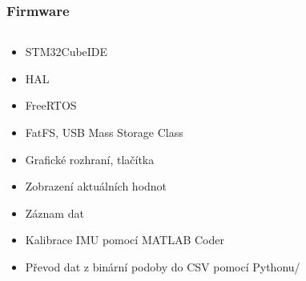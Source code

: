 \documentclass[%
  12pt,       				%
	t,                  %
	aspectratio=1610,   %
	unicode,						%
]{beamer}				    	%
\begin{document}
\begin{frame}
\begin{columns}[T]
\begin{column}{0.5\textwidth}
\begin{figure}
		\end{figure}
		\end{column}
	\end{columns}	
\end{frame}

\begin{frame} 
	\frametitle{Firmware}
	
	\begin{columns}[T] 								%
		\begin{column}{0.5\textwidth}		%
			
			\begin{itemize}
				\item STM32CubeIDE
				\item HAL
				\item FreeRTOS
				\item FatFS, USB Mass Storage Class
				\item Grafické rozhraní, tlačítka
				\item Zobrazení aktuálních hodnot
				\item Záznam dat
				\item Kalibrace IMU pomocí MATLAB Coder
				\item Převod dat z binární podoby do CSV pomocí Pythonu/
				

\end{itemize}
\end{column}
\end{columns}
\end{frame}
\end{document}
